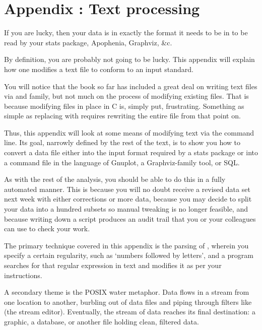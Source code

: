 \setcounter{chapter}{2}
\setcounter{section}{0}
\setcounter{subsection}{0}
\setcounter{ex}{0}
\chapter{Appendix \thechapter: Text processing} \label{textappendix}

If you are lucky, then your data is in exactly the format it needs to be
in to be read by your stats package, Apophenia, Graphviz, \&c.

By definition, you are probably not going to be lucky. This appendix will
explain how one modifies a text file to conform to an input standard. 

You will notice that the book so far has included a great deal on writing
text files via  and family, but not much on the process of
modifying existing files. That is because modifying files in place in
C is, simply put, frustrating. Something as simple as replacing 
with  requires rewriting the entire file from that point on.

Thus, this appendix will look at some means of modifying text via the
command line. Its goal, narrowly defined by the rest of the text, is to
show you how to convert a data file either into the input format required
by a stats package or into a command file in the language of Gnuplot,
a Graphviz-family tool, or SQL.

As with the rest of the analysis, you should be able to do this in a
fully automated manner. This is because you will no doubt receive a
revised data set next week with either corrections or more data, because
you may decide to split your data into a hundred subsets so manual
tweaking is no longer feasible, and because writing down a script
produces an audit trail that you or your colleagues can use to check
your work.

The primary technique covered in this appendix is the parsing of
, wherein you specify a certain regularity,
such as `numbers followed by letters', and a program searches for that
regular expression in text and modifies it as per your instructions.

A secondary theme is the POSIX water metaphor. Data flows in a stream from
one location to another, burbling out of data files and piping through
filters like  (the stream editor).  Eventually, the stream of
data reaches its final destination: a graphic, a database, or another
file holding clean, filtered data.

